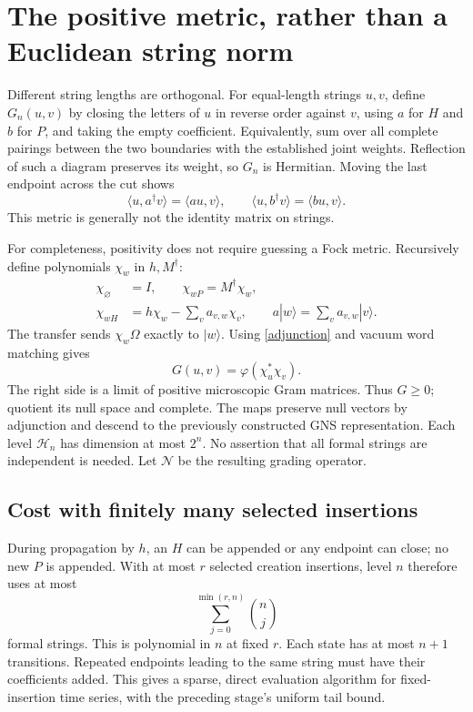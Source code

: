 \documentclass[11pt]{article}
\newcommand{\ph}{\varphi}
\newcommand{\HH}{\mathcal H}
\newcommand{\bn}[2]{\binom{#1}{#2}}
\begin{document}
\newpage
\section{The positive metric, rather than a Euclidean string norm}
Different string lengths are orthogonal. For equal-length strings
$u,v$, define $G_n(u,v)$ by closing the letters of $u$ in reverse
order against $v$, using $a$ for $H$ and $b$ for $P$, and taking
the empty coefficient. Equivalently, sum over all complete
pairings between the two boundaries with the established joint
weights. Reflection of such a diagram preserves its weight, so
$G_n$ is Hermitian. Moving the last endpoint across the cut shows
\begin{equation}\label{adjunction}
 \langle u,a^\dagger v\rangle=\langle au,v\rangle,\qquad
 \langle u,b^\dagger v\rangle=\langle bu,v\rangle.
\end{equation}
This metric is generally not the identity matrix on strings.

For completeness, positivity does not require guessing a Fock
metric. Recursively define polynomials $\chi_w$ in $h,M^\dagger$:
\begin{align}
 \chi_\varnothing&=I,\qquad \chi_{wP}=M^\dagger\chi_w,\\
 \chi_{wH}&=h\chi_w-\sum_v a_{v,w}\chi_v,
 \qquad a|w\rangle=\sum_v a_{v,w}|v\rangle.
\end{align}
The transfer sends $\chi_w\Omega$ exactly to $|w\rangle$.
Using \eqref{adjunction} and vacuum word matching gives
\begin{equation}
 G(u,v)=\ph(\chi_u^*\chi_v).
\end{equation}
The right side is a limit of positive microscopic Gram matrices.
Thus $G\ge0$; quotient its null space and complete. The maps
preserve null vectors by adjunction and descend to the previously
constructed GNS representation. Each level $\HH_n$ has dimension
at most $2^n$. No assertion that all formal strings are independent
is needed. Let $\mathcal N$ be the resulting grading operator.

\subsection*{Cost with finitely many selected insertions}
During propagation by $h$, an $H$ can be appended or any endpoint
can close; no new $P$ is appended. With at most $r$ selected
creation insertions, level $n$ therefore uses at most
\begin{equation}
 \sum_{j=0}^{\min(r,n)}\bn nj
\end{equation}
formal strings. This is polynomial in $n$ at fixed $r$.
Each state has at most $n+1$ transitions. Repeated endpoints
leading to the same string must have their coefficients added.
This gives a sparse, direct evaluation algorithm for fixed-insertion
time series, with the preceding stage's uniform tail bound.
\end{document}

